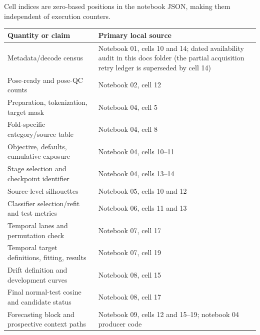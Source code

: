 \documentclass[11pt,letterpaper]{article}
\newcounter{none}
\begin{document}
Cell indices are zero-based positions in the notebook JSON, making them
independent of execution counters.

\begin{minipage}{\linewidth}

{\def\LTcaptype{none} %
\begin{longtable}[]{@{}
  >{\raggedright\arraybackslash}p{}
  >{\raggedright\arraybackslash}p{}@{}}
\toprule\noalign{}
\begin{minipage}[b]{\linewidth}\raggedright
Quantity or claim
\end{minipage} & \begin{minipage}[b]{\linewidth}\raggedright
Primary local source
\end{minipage} \\
\midrule\noalign{}
\endhead
\bottomrule\noalign{}
\endlastfoot
Metadata/decode census & Notebook 01, cells 10 and 14; dated
availability audit in this docs folder (the partial acquisition retry
ledger is superseded by cell 14) \\
Pose-ready and pose-QC counts & Notebook 02, cell 12 \\
Preparation, tokenization, target mask & Notebook 04, cell 5 \\
Fold-specific category/source table & Notebook 04, cell 8 \\
Objective, defaults, cumulative exposure & Notebook 04, cells 10--11 \\
Stage selection and checkpoint identifier & Notebook 04, cells 13--14 \\
Source-level silhouettes & Notebook 05, cells 10 and 12 \\
Classifier selection/refit and test metrics & Notebook 06, cells 11 and
13 \\
Temporal lanes and permutation check & Notebook 07, cell 17 \\
Temporal target definitions, fitting, results & Notebook 07, cell 19 \\
Drift definition and development curves & Notebook 08, cell 15 \\
Final normal-test cosine and candidate status & Notebook 08, cell 17 \\
Forecasting block and prospective context paths & Notebook 09, cells 12
and 15--19; notebook 04 producer code \\
\end{longtable}
}

\end{minipage}
\end{document}
